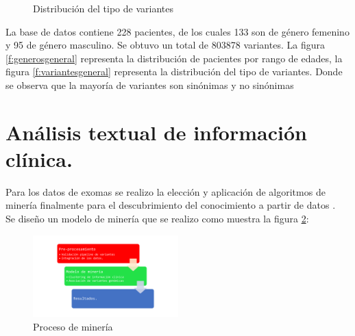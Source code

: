  \begin{figure}[H]
 	\centering
 	\caption{Distribución del tipo de variantes}
 	\label{f:general}
 \end{figure}
 
La base de datos contiene 228 pacientes, de los cuales 133 son de género femenino y 95 de género masculino. Se obtuvo un total de 803878 variantes. La  figura \ref{f:generosgeneral} representa la distribución de pacientes por rango de edades, la figura \ref{f:variantesgeneral} representa la distribución del tipo de variantes. Donde se observa que la mayoría de variantes son sinónimas y no sinónimas 






\section{Análisis textual de información clínica.}



Para los datos de exomas se realizo la elección y aplicación de algoritmos de minería finalmente para el descubrimiento del conocimiento a partir de datos  \cite{Farid2016}. \\

Se diseño un modelo de minería que se realizo como muestra la figura \ref{fig:mineria}:

\begin{figure}[H]
	\centering
	\includegraphics[width=0.5\textwidth]{Kap4/pipelinemineria}
	\caption{Proceso de minería} \label{fig:mineria}
\end{figure} 

